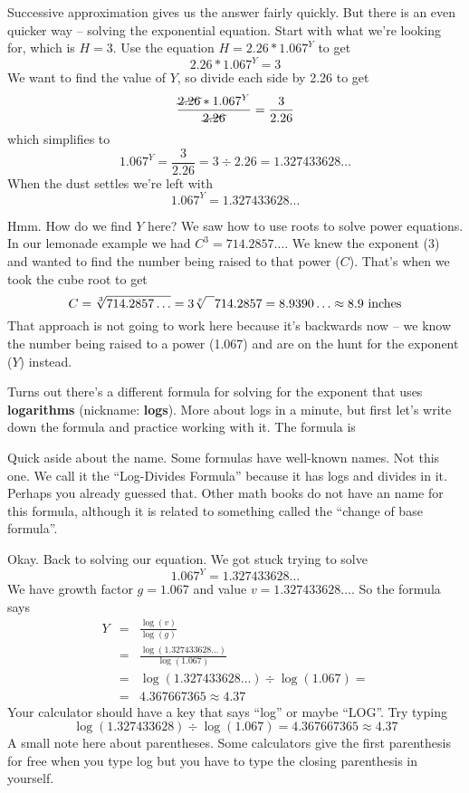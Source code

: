 Successive approximation gives us the answer fairly quickly.  But there is an even quicker way -- solving the exponential equation.  Start with what we're looking for, which is $H= 3$.  Use the equation $H=2.26\ast1.067^Y$ to get $$2.26\ast1.067^Y=3$$ We want to find the value of $Y$, so divide each side by 2.26 to get 
$$\frac{\cancel{2.26}\ast1.067^Y}{\cancel{2.26}}= \frac{3} {2.26}$$ 
which simplifies to 
$$1.067^Y=\frac{3}{2.26}=3 \div 2.26 = 1.327433628\ldots$$  
When the dust settles we're left with $$1.067^Y = 1.327433628\ldots$$ 

Hmm.  How do we find $Y$ here? We saw how to use roots to solve power equations.  In our lemonade example we had $C^3 = 714.2857\ldots$.  We knew the exponent (3) and wanted to find the number being raised to that power ($C$).  That's when we took the cube root to get 
$$C = \sqrt[3]{714.2857\ldots} =3 \sqrt[x]{\text{\raisebox{.6em}{~\text{  }}}} 714.2857 = 8.9390\ldots \approx 8.9 \text{ inches}$$
That approach is not going to work here because it's backwards now -- we know the number being raised to a power (1.067) and are on the hunt for the exponent ($Y$) instead.  

Turns out there's a different formula for solving for the exponent that uses  \textbf{logarithms} (nickname: \textbf{logs}). More about logs in a minute, but first let's write down the formula and practice working with it.  The formula is 

 \bigskip
\bigskip

\noindent
Quick aside about the name.  Some formulas have well-known names. Not this one.  We call it the ``Log-Divides Formula'' because it has logs and divides in it.  Perhaps you already guessed that.  Other math books do not have an name for this formula, although it is related to something called the ``change of base formula''.  

Okay.  Back to solving our equation. We got stuck trying to solve $$1.067^Y = 1.327433628\ldots$$ 
We have growth factor $g = 1.067$ and value $v=1.327433628\ldots$.
So the formula says  \begin{eqnarray*}
Y & = &  \frac{\log (v)}{\log(g)}\\
& = &  \frac{\log (1.327433628\ldots)}{\log(1.067)}\\
& =  &  \log (1.327433628\ldots) \div \log (1.067) = \\
& =  &  4.367667365 \approx  4.37 
\end{eqnarray*}
Your calculator should have a key that says ``log'' or maybe ``LOG''.  Try typing $$\log( 1.327433628) \div \log (1.067) = 4.367667365 \approx 4.37$$
A small note here about parentheses.  Some calculators give the first parenthesis for free when you type log but you have to type the closing parenthesis in yourself.  

